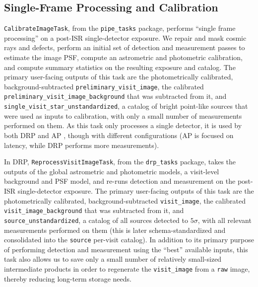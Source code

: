 \subsection{Single-Frame Processing and Calibration}
\label{sec:sfp}

\texttt{CalibrateImageTask}, from the \texttt{pipe\_tasks} package, performs ``single frame processing'' on a post-ISR  single-detector exposure.
We repair and mask cosmic rays and defects, perform an initial set of detection  and measurement  passes to estimate the image PSF, compute an astrometric  and photometric  calibration, and compute summary statistics on the resulting exposure and catalog.
The primary user-facing outputs of this task are the photometrically calibrated, background-subtracted \texttt{preliminary\_\-visit\_\-image}, the calibrated \texttt{preliminary\_\-visit\_\-image\_\-background} that was subtracted from it, and \texttt{single\_\-visit\_\-star\_\-unstandardized}, a catalog of bright point-like sources that were used as inputs to calibration, with only a small number of measurements performed on them.
As this task only processes a single detector, it is used by both DRP  and AP , though with different configurations (AP is focused on latency, while DRP performs more measurements).

In DRP, \texttt{ReprocessVisitImageTask}, from the \texttt{drp\_tasks} package, takes the outputs of the global astrometric and photometric models, a visit-level background and PSF model, and re-runs detection and measurement on the post-ISR single-detector exposure.
The primary user-facing outputs of this task are the photometrically calibrated, background-subtracted \texttt{visit\_image}, the calibrated \texttt{visit\_image\_background} that was subtracted from it, and \texttt{source\_unstandardized}, a catalog of all sources detected to $5\sigma$, with all relevant measurements performed on them (this is later schema-standardized and consolidated into the \texttt{source} per-visit catalog).
In addition to  its primary purpose of performing detection and measurement using the ``best'' available inputs, this task also allows us to save only a small number of relatively small-sized intermediate products in order to regenerate the  \texttt{visit\_image} from a \texttt{raw} image, thereby reducing long-term storage needs.
